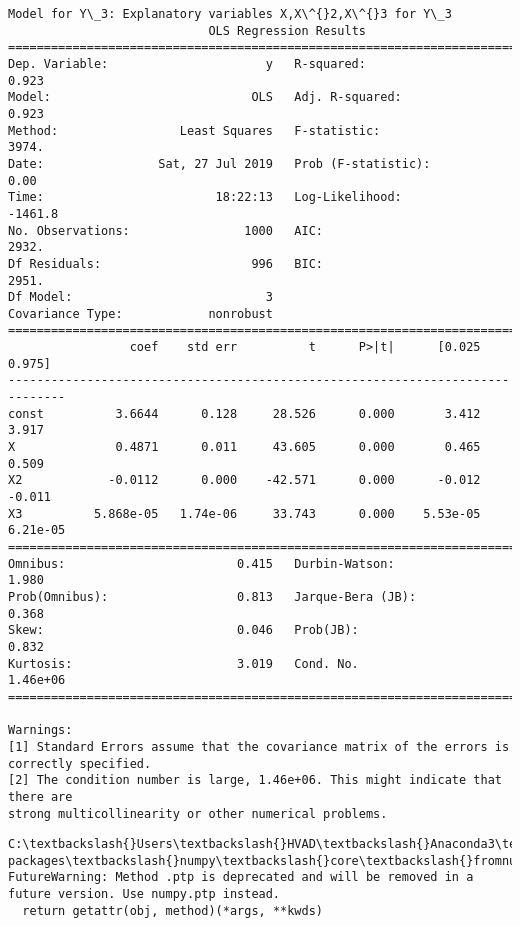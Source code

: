 \documentclass[11pt]{article}
\begin{document}
\begin{Verbatim}[commandchars=\\\{\}]
Model for Y\_3: Explanatory variables X,X\^{}2,X\^{}3 for Y\_3
                            OLS Regression Results                            
==============================================================================
Dep. Variable:                      y   R-squared:                       0.923
Model:                            OLS   Adj. R-squared:                  0.923
Method:                 Least Squares   F-statistic:                     3974.
Date:                Sat, 27 Jul 2019   Prob (F-statistic):               0.00
Time:                        18:22:13   Log-Likelihood:                -1461.8
No. Observations:                1000   AIC:                             2932.
Df Residuals:                     996   BIC:                             2951.
Df Model:                           3                                         
Covariance Type:            nonrobust                                         
==============================================================================
                 coef    std err          t      P>|t|      [0.025      0.975]
------------------------------------------------------------------------------
const          3.6644      0.128     28.526      0.000       3.412       3.917
X              0.4871      0.011     43.605      0.000       0.465       0.509
X2            -0.0112      0.000    -42.571      0.000      -0.012      -0.011
X3          5.868e-05   1.74e-06     33.743      0.000    5.53e-05    6.21e-05
==============================================================================
Omnibus:                        0.415   Durbin-Watson:                   1.980
Prob(Omnibus):                  0.813   Jarque-Bera (JB):                0.368
Skew:                           0.046   Prob(JB):                        0.832
Kurtosis:                       3.019   Cond. No.                     1.46e+06
==============================================================================

Warnings:
[1] Standard Errors assume that the covariance matrix of the errors is correctly specified.
[2] The condition number is large, 1.46e+06. This might indicate that there are
strong multicollinearity or other numerical problems.

    \end{Verbatim}

    \begin{Verbatim}[commandchars=\\\{\}]
C:\textbackslash{}Users\textbackslash{}HVAD\textbackslash{}Anaconda3\textbackslash{}lib\textbackslash{}site-packages\textbackslash{}numpy\textbackslash{}core\textbackslash{}fromnumeric.py:52: FutureWarning: Method .ptp is deprecated and will be removed in a future version. Use numpy.ptp instead.
  return getattr(obj, method)(*args, **kwds)

    \end{Verbatim}
\end{document}
